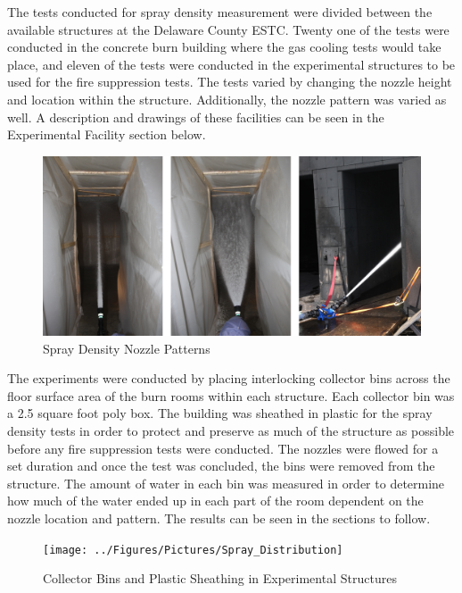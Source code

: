 \documentclass[12pt,oneside]{book}
\begin{document}
The tests conducted for spray density measurement were divided between the available structures at the Delaware County ESTC. Twenty one of the tests were conducted in the concrete burn building where the gas cooling tests would take place, and eleven of the tests were conducted in the experimental structures to be used for the fire suppression tests. The tests varied by changing the nozzle height and location within the structure. Additionally, the nozzle pattern was varied as well. A description and drawings of these facilities can be seen in the Experimental Facility section below.

\begin{figure}[!ht]
	\includegraphics[width=6in]{../Figures/Pictures/Flows}
	\caption{Spray Density Nozzle Patterns}
	\label{fig:Spray_Density_Nozzle_Patterns}
\end{figure}

The experiments were conducted by placing interlocking collector bins across the floor surface area of the burn rooms within each structure. Each collector bin was a 2.5 square foot poly box. The building was sheathed in plastic for the spray density tests in order to protect and preserve as much of the structure as possible before any fire suppression tests were conducted. The nozzles were flowed for a set duration and once the test was concluded, the bins were removed from the structure.  The amount of water in each bin was measured in order to determine how much of the water ended up in each part of the room dependent on the nozzle location and pattern. The results can be seen in the sections to follow.

\begin{figure}[!ht]
	\texttt{[image: ../Figures/Pictures/Spray\_Distribution]}
	\caption{Collector Bins and Plastic Sheathing in Experimental Structures}
	\label{fig:Spray_Density_Set_Up}
\end{figure}
\end{document}
